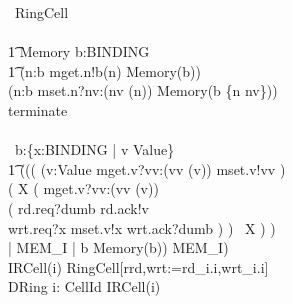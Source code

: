 \documentclass[10pt]{article}
\begin{document}
\begin{circus}
    \circprocess\ RingCell \circdef \\
    \circbegin\\
    \t1
        Memory \circdef
            \circvres b:BINDING \circspot \\
            \t1
                (\Extchoice n:\dom b \circspot mget.n!b(n) \then Memory(b)) \\
                \extchoice (\Extchoice n:\dom b \circspot mset.n?nv:(nv \in \delta(n)) \then Memory(b \oplus \{n \mapsto nv\}))\\
                \extchoice terminate \then \Skip \\
        \\
        \circspot
            \circvar\ b:\{x:BINDING | v \in Value\} \circspot \\
            \t1
            (((
                        (\Intchoice v:Value \circspot mget.v?vv:(vv \in \delta(v)) \then mset.v!vv \then \Skip) \circseq \\
                            ( \circmu X \circspot
                                ( mget.v?vv:(vv \in \delta(v)) \then \\
                                    ( rd.req?dumb \then rd.ack!v \then \Skip \\
                                      \extchoice wrt.req?x \then mset.v!x
                                                \then wrt.ack?dumb \then \Skip
                                    )
                                ) \circseq\ X
                            )
                        ) \\
                        \lpar {} | MEM\_I | { b } \rpar Memory(b))
                        \circhide MEM\_I)
    \circend
    \\
    \circprocess IRCell(i) \circdef RingCell[rrd,wrt:=rd\_i.i,wrt\_i.i]
    \\
    \circprocess DRing \circdef \Interleave i: CellId \circspot IRCell(i)
\end{circus}%
\end{document}
